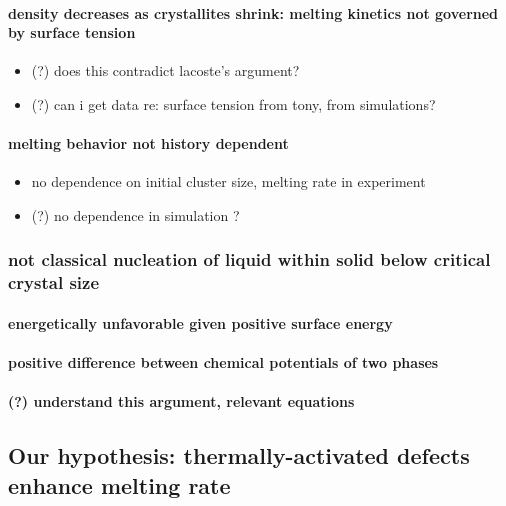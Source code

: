 \documentclass{umthesis}
\begin{document}
\paragraph{density decreases as crystallites shrink: melting kinetics not governed by surface tension}
\label{sec-2.1.2.4.2}
\begin{itemize}

\item (?) does this contradict lacoste's argument?\\
\label{sec-2.1.2.4.2.1}%
\item (?) can i get data re: surface tension from tony, from simulations?\\
\label{sec-2.1.2.4.2.2}%
\end{itemize} %
\paragraph{melting behavior not history dependent}
\label{sec-2.1.2.4.3}
\begin{itemize}

\item no dependence on initial cluster size, melting rate in experiment\\
\label{sec-2.1.2.4.3.1}%
\item (?) no dependence in simulation ?\\
\label{sec-2.1.2.4.3.2}%
\end{itemize} %
\subsubsection{not classical nucleation of liquid within solid below critical crystal size}
\label{sec-2.1.2.5}
\paragraph{energetically unfavorable given positive surface energy}
\label{sec-2.1.2.5.1}
\paragraph{positive difference between chemical potentials of two phases}
\label{sec-2.1.2.5.2}
\paragraph{(?) understand this argument, relevant equations}
\label{sec-2.1.2.5.3}
\subsection{Our hypothesis:  thermally-activated defects enhance melting rate}
\label{sec-2.1.3}
\end{document}
